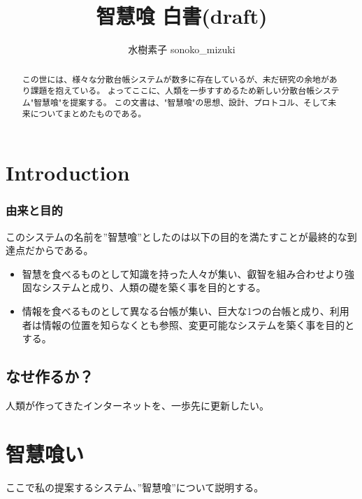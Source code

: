 \documentclass[10pt,a4paper]{jarticle}
\title{智慧喰 白書(draft)}
\author{水樹素子 sonoko\_mizuki}
\begin{document}
\maketitle
\begin{abstract}
この世には、様々な分散台帳システムが数多に存在しているが、未だ研究の余地があり課題を抱えている。
よってここに、人類を一歩すすめるため新しい分散台帳システム"智慧喰"を提案する。
この文書は、"智慧喰"の思想、設計、プロトコル、そして未来についてまとめたものである。
\end{abstract}

\begin{multicols}{2}

\section{Introduction}
\subsubsection{由来と目的}
このシステムの名前を”智慧喰”としたのは以下の目的を満たすことが最終的な到達点だからである。
\begin{itemize}
  \item 智慧を食べるものとして知識を持った人々が集い、叡智を組み合わせより強固なシステムと成り、人類の礎を築く事を目的とする。
  \item 情報を食べるものとして異なる台帳が集い、巨大な1つの台帳と成り、利用者は情報の位置を知らなくとも参照、変更可能なシステムを築く事を目的とする。
\end{itemize}

\subsection{なせ作るか？}
人類が作ってきたインターネットを、一歩先に更新したい。

\section{智慧喰い}
ここで私の提案するシステム、”智慧喰”について説明する。

\end{multicols}
\end{document}
